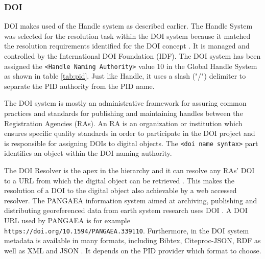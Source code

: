\subsubsection{DOI}\label{doi}
DOI makes used of the Handle system as described earlier. The Handle System was selected for the resolution task within the DOI system because it matched the resolution requirements identified for the DOI concept \cite{doi-found}. It is managed and
controlled by the International DOI Foundation (IDF). The DOI system has been assigned the \texttt{<Handle Naming Authority>} value 10 in the Global Handle System as shown in table \ref{tab:pid}. Just like Handle, it uses a slash ("/") delimiter to separate the PID authority from the PID name.

The DOI system is mostly an administrative framework for assuring common practices and standards for publishing and maintaining handles between the Registration Agencies (RAs). An RA is an organization or institution which ensures specific quality standards in order to participate in the DOI project and is responsible for assigning DOIs to digital objects. 
The \texttt{<doi name syntax>} part identifies an object within the DOI naming authority. 

The DOI Resolver is the apex in the hierarchy and it can resolve any RAs' DOI to a URL from which the digital object can be retrieved \cite{icn-bd}. 
This makes the resolution of a DOI to the digital object also achievable by a web accessed resolver. The PANGAEA information system aimed at archiving, publishing and distributing georeferenced data from earth system research uses DOI \cite{pang}. A DOI URL used by PANGAEA is for example \texttt{https://doi.org/10.1594/PANGAEA.339110}.
Furthermore, in the DOI system metadata is available in many formats, including Bibtex, Citeproc-JSON, RDF as well as XML and JSON \cite{doi-met}. It depends on the PID provider which format to choose.


